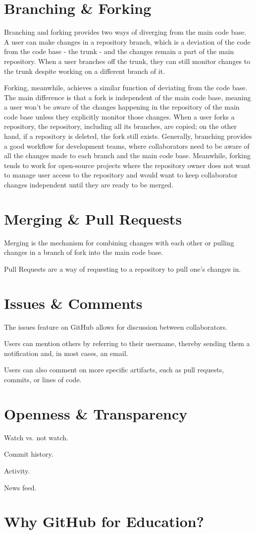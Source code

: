 \section{Branching \& Forking}
Branching and forking provides two ways of diverging from the main code base. A user can make changes in a repository branch, which is a deviation of the code from the code base - the trunk - and the changes remain a part of the main repository. When a user branches off the trunk, they can still monitor changes to the trunk despite working on a different branch of it.

Forking, meanwhile, achieves a similar function of deviating from the code base. The main difference is that a fork is independent of the main code base, meaning a user won't be aware of the changes happening in the repository of the main code base unless they explicitly monitor those changes. When a user forks a repository, the repository, including all its branches, are copied; on the other hand, if a repository is deleted, the fork still exists. Generally, branching provides a good workflow for development teams, where collaborators need to be aware of all the changes made to each branch and the main code base. Meanwhile, forking tends to work for open-source projects where the repository owner does not want to manage user access to the repository and would want to keep collaborator changes independent until they are ready to be merged.

\section{Merging \& Pull Requests}
Merging is the mechanism for combining changes with each other or pulling changes in a branch of fork into the main code base.

Pull Requests are a way of requesting to a repository to pull one's changes in.

\section{Issues \& Comments}
The issues feature on GitHub allows for discussion between collaborators.

Users can mention others by referring to their username, thereby sending them a notification and, in most cases, an email.

Users can also comment on more specific artifacts, such as pull requests, commits, or lines of code.

\section{Openness \& Transparency}
Watch vs. not watch.

Commit history.

Activity.

News feed.

\section{Why GitHub for Education?}
